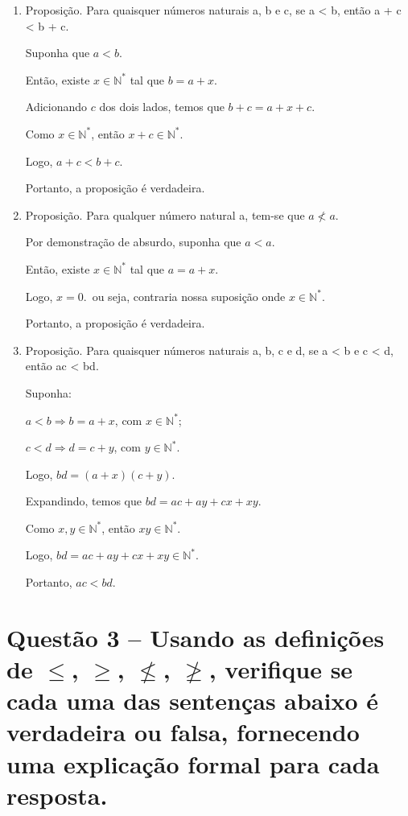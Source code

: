 \documentclass[12pt,a4paper]{article}
\begin{document}
    \begin{enumerate}[label= (\alph*)]
        \item Proposição. Para quaisquer números naturais a, b e c, se a < b, então a + c < b + c.
        
        Suponha que $a < b$.

        Então, existe $x \in \mathbb{N}^*$ tal que $b=a+x$.

        Adicionando $c$ dos dois lados, temos que $b+c=a+x+c$.

        Como $x \in \mathbb{N}^*$, então $x+c \in \mathbb{N}^*$.

        Logo, $a+c < b+c$.

        Portanto, a proposição é verdadeira.

        \item Proposição. Para qualquer número natural a, tem-se que $a \nless a$.
        
        Por demonstração de absurdo, suponha que $a < a$.

        Então, existe $x \in \mathbb{N}^*$ tal que $a=a+x$.

        Logo, $x=0$.\ ou seja, contraria nossa suposição onde $x \in \mathbb{N}^*$.

        Portanto, a proposição é verdadeira.

        \item Proposição. Para quaisquer números naturais a, b, c e d, se a < b e c < d, então ac < bd.
        
        Suponha:

        $a<b\Rightarrow b=a+x$, com $x\in\mathbb{N}^*$;

        $c<d\Rightarrow d=c+y$, com $y\in\mathbb{N}^*$.

        Logo, $bd=(a+x)(c+y)$.

        Expandindo, temos que $bd=ac+ay+cx+xy$.

        Como $x,y\in\mathbb{N}^*$, então $xy\in\mathbb{N}^*$.

        Logo, $bd=ac+ay+cx+xy\in\mathbb{N}^*$.

        Portanto, $ac<bd$.
    \end{enumerate}

\section*{Questão 3 -- Usando as definições de $\leq$, $\geq$, $\nleq$, $\ngeq$, verifique se cada uma das sentenças abaixo é verdadeira ou falsa, fornecendo uma explicação formal para cada resposta.}
    
\end{document}
